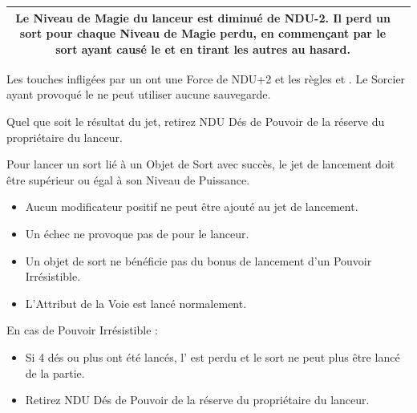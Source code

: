 \begin{multicols}{2}
\begin{center}
\begin{tabular}{cm{6.75cm}@{}}
\vspace*{3pt}
Le Niveau de Magie du lanceur est diminué de NDU-2. Il perd un sort pour chaque Niveau de Magie perdu, en commençant par le sort ayant causé le \miscast{} et en tirant les autres au hasard.\tabularnewline
\hline
\end{tabular}
\end{center}

\vspace*{5pt}
\noindent Les touches infligées par un \miscast{} ont une Force de NDU+2 et les règles \magicalattacks{} et . Le Sorcier ayant provoqué le \miscast{} ne peut utiliser aucune sauvegarde.

\vspace*{5pt}
\noindent Quel que soit le résultat du jet, retirez NDU Dés de Pouvoir de la réserve du propriétaire du lanceur.

\vspace*{10pt}
\begin{framed}
\vspace*{-17pt}
\basicsubtitle{\boundspells{}}

\noindent Pour lancer un sort lié à un Objet de Sort avec succès, le jet de lancement doit être supérieur ou égal à son Niveau de Puissance.
\begin{itemize}[label={-}, itemsep=3pt]
\item Aucun modificateur positif ne peut être ajouté au jet de lancement.
\item Un échec ne provoque pas de \lostfocus{} pour le lanceur.
\item Un objet de sort ne bénéficie pas du bonus de lancement d'un Pouvoir Irrésistible.
\item L'Attribut de la Voie est lancé normalement.
\end{itemize}

\noindent En cas de Pouvoir Irrésistible :
\begin{itemize}[label={-}, itemsep=3pt]
\item Si 4 dés ou plus ont été lancés, l'\boundspell{} est perdu et le sort ne peut plus être lancé de la partie.
\item Retirez NDU Dés de Pouvoir de la réserve du propriétaire du lanceur.
\end{itemize}
\end{framed}

\vspace*{\fill}
\end{multicols}


